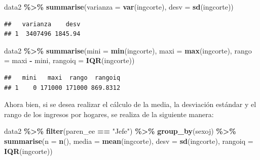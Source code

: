 \documentclass[
  12pt,
]{book}
\newenvironment{Shaded}{\begin{snugshade}}{\end{snugshade}}
\newcommand{\AttributeTok}[1]{\textcolor[rgb]{0.13,0.29,0.53}{#1}}
\newcommand{\FunctionTok}[1]{\textcolor[rgb]{0.13,0.29,0.53}{\textbf{#1}}}
\newcommand{\NormalTok}[1]{#1}
\newcommand{\SpecialCharTok}[1]{\textcolor[rgb]{0.81,0.36,0.00}{\textbf{#1}}}
\newcommand{\StringTok}[1]{\textcolor[rgb]{0.31,0.60,0.02}{#1}}
\begin{document}
\begin{Shaded}
\begin{Highlighting}[]
\NormalTok{data2 }\SpecialCharTok{\%\textgreater{}\%} \FunctionTok{summarise}\NormalTok{(}\AttributeTok{varianza =} \FunctionTok{var}\NormalTok{(ingcorte),}
                    \AttributeTok{desv =} \FunctionTok{sd}\NormalTok{(ingcorte))}
\end{Highlighting}
\end{Shaded}

\begin{verbatim}
##   varianza    desv
## 1  3407496 1845.94
\end{verbatim}

\begin{Shaded}
\begin{Highlighting}[]
\NormalTok{data2 }\SpecialCharTok{\%\textgreater{}\%} \FunctionTok{summarise}\NormalTok{(}\AttributeTok{mini =} \FunctionTok{min}\NormalTok{(ingcorte),}
                    \AttributeTok{maxi =} \FunctionTok{max}\NormalTok{(ingcorte),}
                    \AttributeTok{rango =}\NormalTok{ maxi }\SpecialCharTok{{-}}\NormalTok{ mini,}
                    \AttributeTok{rangoiq =} \FunctionTok{IQR}\NormalTok{(ingcorte))}
\end{Highlighting}
\end{Shaded}

\begin{verbatim}
##   mini   maxi  rango  rangoiq
## 1    0 171000 171000 869.8312
\end{verbatim}

Ahora bien, si se desea realizar el cálculo de la media, la desviación estándar y el rango de los ingresos por hogares, se realiza de la siguiente manera:

\begin{Shaded}
\begin{Highlighting}[]
\NormalTok{data2 }\SpecialCharTok{\%\textgreater{}\%} \FunctionTok{filter}\NormalTok{(paren\_ee }\SpecialCharTok{==} \StringTok{"Jefe"}\NormalTok{) }\SpecialCharTok{\%\textgreater{}\%}
  \FunctionTok{group\_by}\NormalTok{(sexoj) }\SpecialCharTok{\%\textgreater{}\%}
  \FunctionTok{summarise}\NormalTok{(}\AttributeTok{n =} \FunctionTok{n}\NormalTok{(),}
            \AttributeTok{media =} \FunctionTok{mean}\NormalTok{(ingcorte),}
            \AttributeTok{desv =} \FunctionTok{sd}\NormalTok{(ingcorte),}
            \AttributeTok{rangoiq =} \FunctionTok{IQR}\NormalTok{(ingcorte))}
\end{Highlighting}
\end{Shaded}
\end{document}
